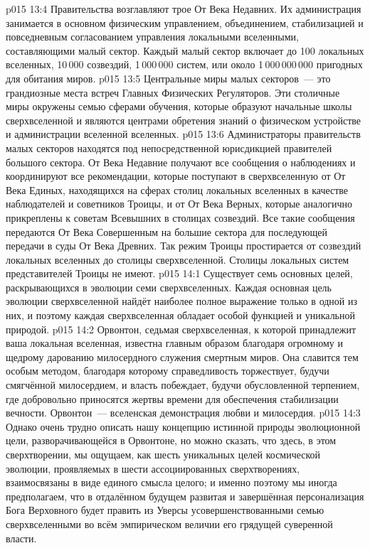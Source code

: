 \vs p015 13:4 \pc Правительства  возглавляют трое От Века Недавних. Их администрация занимается в основном физическим управлением, объединением, стабилизацией и повседневным согласованием управления локальными вселенными, составляющими малый сектор. Каждый малый сектор включает до 100 локальных вселенных, 10\,000 созвездий, 1\,000\,000 систем, или около 1\,000\,000\,000 пригодных для обитания миров.
\vs p015 13:5 Центральные миры малых секторов~--- это грандиозные места встреч Главных Физических Регуляторов. Эти столичные миры окружены семью сферами обучения, которые образуют начальные школы сверхвселенной и являются центрами обретения знаний о физическом устройстве и администрации вселенной вселенных.
\vs p015 13:6 Администраторы правительств малых секторов находятся под непосредственной юрисдикцией правителей большого сектора. От Века Недавние получают все сообщения о наблюдениях и координируют все рекомендации, которые поступают в сверхвселенную от От Века Единых, находящихся на сферах столиц локальных вселенных в качестве наблюдателей и советников Троицы, и от От Века Верных, которые аналогично прикреплены к советам Всевышних в столицах созвездий. Все такие сообщения передаются От Века Совершенным на большие сектора для последующей передачи в суды От Века Древних. Так режим Троицы простирается от созвездий локальных вселенных до столицы сверхвселенной. Столицы локальных систем представителей Троицы не имеют.
\vs p015 14:1 Существует семь основных целей, раскрывающихся в эволюции семи сверхвселенных. Каждая основная цель эволюции сверхвселенной найдёт наиболее полное выражение только в одной из них, и поэтому каждая сверхвселенная обладает особой функцией и уникальной природой.
\vs p015 14:2 Орвонтон, седьмая сверхвселенная, к которой принадлежит ваша локальная вселенная, известна главным образом благодаря огромному и щедрому дарованию милосердного служения смертным миров. Она славится тем особым методом, благодаря которому справедливость торжествует, будучи смягчённой милосердием, и власть побеждает, будучи обусловленной терпением, где добровольно приносятся жертвы времени для обеспечения стабилизации вечности. Орвонтон~--- вселенская демонстрация любви и милосердия.
\vs p015 14:3 Однако очень трудно описать нашу концепцию истинной природы эволюционной цели, разворачивающейся в Орвонтоне, но можно сказать, что здесь, в этом сверхтворении, мы ощущаем, как шесть уникальных целей космической эволюции, проявляемых в шести ассоциированных сверхтворениях, взаимосвязаны в виде единого смысла целого; и именно поэтому мы иногда предполагаем, что в отдалённом будущем развитая и завершённая персонализация Бога Верховного будет править из Уверсы усовершенствованными семью сверхвселенными во всём эмпирическом величии его грядущей суверенной власти.
